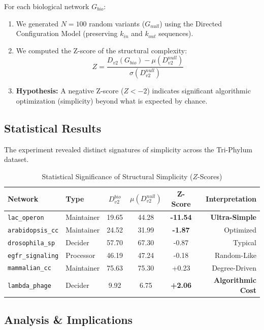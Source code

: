 \documentclass{article}
\begin{document}
For each biological network $G_{bio}$:
\begin{enumerate}
    \item We generated $N=100$ random variants ($G_{null}$) using the Directed Configuration Model (preserving $k_{in}$ and $k_{out}$ sequences).
    \item We computed the Z-score of the structural complexity:
    $$ Z = \frac{D_{v2}(G_{bio}) - \mu(D_{v2}^{null})}{\sigma(D_{v2}^{null})} $$
    \item \textbf{Hypothesis:} A negative Z-score ($Z < -2$) indicates significant algorithmic optimization (simplicity) beyond what is expected by chance.
\end{enumerate}

\subsection{Statistical Results}
The experiment revealed distinct signatures of simplicity across the Tri-Phylum dataset.

\begin{table}[H]
\centering
\caption{Statistical Significance of Structural Simplicity ($Z$-Scores)}
\label{tab:z_scores}
\begin{tabular}{@{}l l c c c r@{}}
\toprule
\textbf{Network} & \textbf{Type} & \textbf{$D_{v2}^{bio}$} & \textbf{$\mu(D_{v2}^{null})$} & \textbf{Z-Score} & \textbf{Interpretation} \\ \midrule
\texttt{lac\_operon} & Maintainer & 19.65 & 44.28 & \textbf{-11.54} & \textbf{Ultra-Simple} \\
\texttt{arabidopsis\_cc} & Maintainer & 24.52 & 31.99 & \textbf{-1.87} & Optimized \\
\texttt{drosophila\_sp} & Decider & 57.70 & 67.30 & -0.87 & Typical \\
\texttt{egfr\_signaling} & Processor & 46.19 & 47.24 & -0.18 & Random-Like \\
\texttt{mammalian\_cc} & Maintainer & 75.63 & 75.30 & +0.23 & Degree-Driven \\
\texttt{lambda\_phage} & Decider & 9.92 & 6.75 & \textbf{+2.06} & \textbf{Algorithmic Cost} \\
\bottomrule
\end{tabular}
\end{table}

\subsection{Analysis \& Implications}
\end{document}
